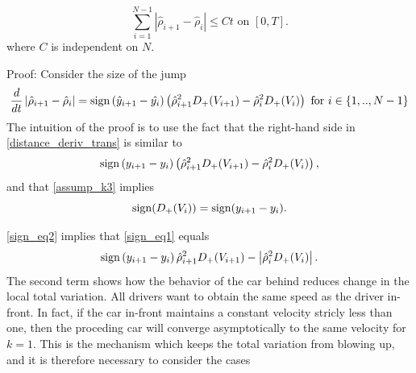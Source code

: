 \begin{equation}
	\sum_{i=1}^{N-1} \left| \hat{\rho}_{i+1}-\hat{\rho}_{i} \right| \leq C t \text{ on } [0,T].
\end{equation} \label{TV_yhat}
where $C$ is independent on $N$. 

Proof: 
Consider the size of the jump 
\begin{align} \label{distance_deriv_trans}
	\frac{d}{dt} \left| \hat{\rho}_{i+1} - \hat{\rho}_{i} \right| = \operatorname{sign}\left(\hat{y}_{i+1} - \hat{y_{i}}\right) \left(\hat{\rho}_{i+1}^2D_+(V_{i+1}) - \hat{\rho}_{i}^2 D_+(V_i)\right) \text{ for } i \in \{1,..,N-1\}
\end{align}
The intuition of the proof is to use the fact that the right-hand side in \eqref{distance_deriv_trans} is similar to 
\begin{equation} \label{sign_eq1}
	\operatorname{sign}\left(y_{i+1} - y_{i}\right) \left(\hat{\rho}_{i+1}^2 D_+(V_{i+1}) - \hat{\rho}_{i}^2 D_+(V_i)\right),
\end{equation}
and that \eqref{assump_k3} implies 
\begin{equation}\label{sign_eq2}
	\operatorname{sign}(D_+(V_i)) = \operatorname{sign}(y_{i+1} - y_i). 
\end{equation}

\eqref{sign_eq2} implies that \eqref{sign_eq1} equals
\begin{equation} \label{sign_eq3}
	\operatorname{sign}\left(y_{i+1} - y_{i}\right)\hat{\rho}_{i+1}^2 D_+(V_{i+1}) - \left|\hat{\rho}_{i}^2 D_+(V_i)\right|.
\end{equation}
The second term shows how the behavior of the car behind reduces change in the local total variation. All drivers want to obtain the same speed as the driver in-front. In fact, if the car in-front maintains a constant velocity stricly less than one, then the proceding car will converge asymptotically to the same velocity for $k = 1$. This is the mechanism which keeps the total variation from blowing up, and it is therefore necessary to consider the cases

